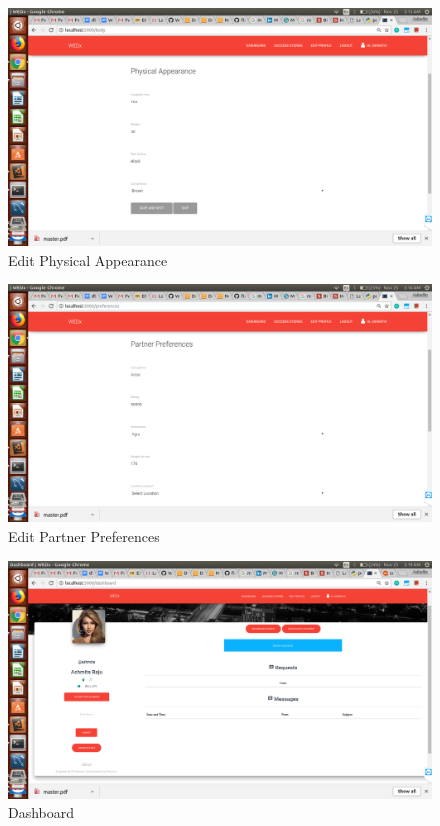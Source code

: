 \documentclass[12pt]{report}
\begin{document}
\begin{figure}[!htb]
    \centering
    \includegraphics[width=1\textwidth]{sc-7.png}
    \caption{Edit Physical Appearance}
    \label{fig:Edit Physical Appearance}
\end{figure}

\begin{figure}[!htb]
    \centering
    \includegraphics[width=1\textwidth]{sc-8.png}
    \caption{Edit Partner Preferences}
    \label{fig:Edit Partner Preferences}
\end{figure}

\begin{figure}[!htb]
    \centering
    \includegraphics[width=1\textwidth]{sc-9.png}
    \caption{Dashboard}
    \label{fig:Dashboard}
\end{figure}
\end{document}
